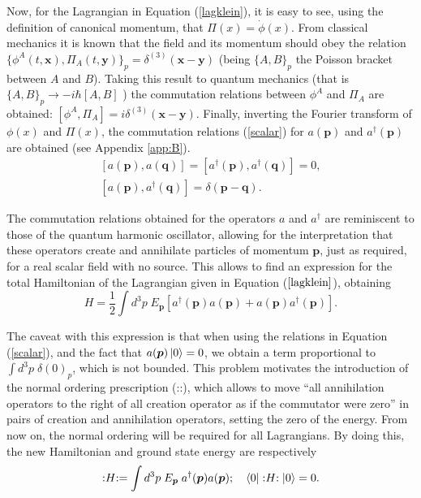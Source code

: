 Now, for the Lagrangian in Equation (\ref{lagklein}), it is easy to see, using the definition of canonical momentum, that $\Pi(x)=\dot{\phi}(x)$. From classical mechanics it is known that the field and its momentum should obey the relation $\{\phi^A(t,\bm{x}), \Pi_A(t,\bm{y})\}_p = \delta^{(3)}(\bm{x}-\bm{y})$ (being $\{A,B\}_p$ the Poisson bracket between $A$ and $B$). Taking this result to quantum mechanics (that is $\{A,B\}_p \rightarrow -i\hbar[A,B]$ \cite{Lancaster}) the commutation relations between $\phi^A$ and $\Pi_A$ are obtained: $[\phi^A,\Pi_A] =i\delta^{(3)}(\bm{x}-\bm{y})$. Finally, inverting the Fourier transform of $\phi(x)$ and $\Pi(x)$, the commutation relations (\ref{scalar}) for $a(\bm{p})$ and $a^{\dagger}(\bm{p})$ are obtained (see Appendix \ref{app:B}).
\begin{equation}
\label{scalar}
\begin{gathered}
    \![a(\bm{p}),a(\bm{q})] = [a^{\dagger}(\bm{p}),a^{\dagger}(\bm{q})] = 0, \\
    [a(\bm{p}),a^{\dagger}(\bm{q})] = \delta(\bm{p} - \bm{q}).
\end{gathered}
\end{equation}

The commutation relations obtained for the operators $a$ and $a^{\dagger}$ are reminiscent to those of the quantum harmonic oscillator, allowing for the interpretation that these operators create and annihilate particles of momentum $\bm{p}$, just as required, for a real scalar field with no source. This allows to find an expression for the total Hamiltonian of the Lagrangian given in Equation ($\ref{lagklein}$), obtaining 
\begin{equation*}
    H = \dfrac{1}{2}\int d^3p \; E_{\bm{p}}[a^{\dagger}(\bm{p})a(\bm{p}) + a(\bm{p})a^{\dagger}(\bm{p})].
\end{equation*}

The caveat with this expression is that when using the relations in Equation (\ref{scalar}), and the fact that $a(\bm{p})\ket{0}=0$, we obtain a term proportional to $\int d^3p \; \delta(0)_p$, which is not bounded. This problem motivates the introduction of the normal ordering prescription (::), which allows to move ``all annihilation operators to the right of all creation operator as if the commutator were zero'' \cite{Lahiri} in pairs of creation and annihilation operators, setting the zero of the energy. From now on, the normal ordering will be required for all Lagrangians. By doing this, the new Hamiltonian and ground state energy are respectively
\begin{gather*}
    :\mathrel{H}: = \int d^3p \; E_{\bm{p}} \; a^{\dagger}(\bm{p})a(\bm{p}); \quad \bra{0}:\mathrel{H}:\ket{0} = 0.
\end{gather*}

